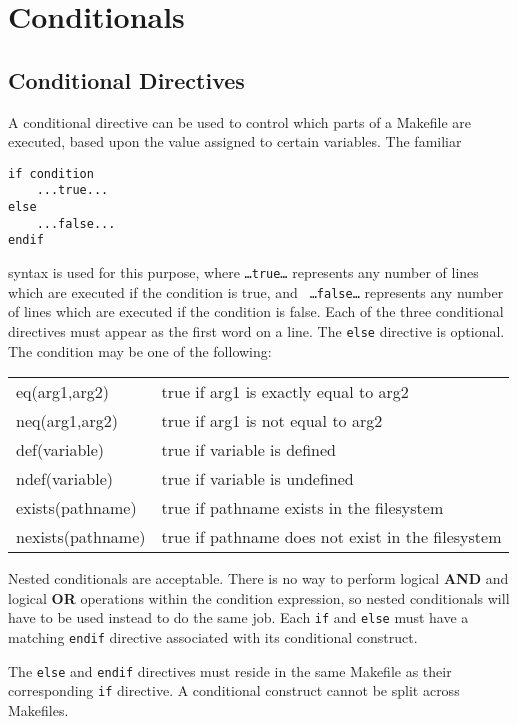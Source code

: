 \section{Conditionals}

\subsection{Conditional Directives}

A conditional directive can be used to control which parts of a Makefile
are executed, based upon the value assigned to certain variables.  The
familiar

\begin{verbatim}
if condition
    ...true...
else
    ...false...
endif
\end{verbatim}

syntax is used for this purpose, where {\tt \ldots true\ldots} represents
any number of lines which are executed if the condition is true, and {\tt
\ldots false\ldots} represents any number of lines which are executed if
the condition is false.  Each of the three conditional directives must
appear as the first word on a line.  The {\tt else} directive is optional.
The condition may be one of the following:

\begin{tabular}{ll}
eq(arg1,arg2)	& true if arg1 is exactly equal to arg2 \\
neq(arg1,arg2)	& true if arg1 is not equal to arg2 \\
def(variable)	& true if variable is defined \\
ndef(variable)	& true if variable is undefined \\
exists(pathname)	& true if pathname exists in the filesystem \\
nexists(pathname)	& true if pathname does not exist in the filesystem
\end{tabular}

Nested conditionals are acceptable.  There is no way to perform logical
{\bf AND} and logical {\bf OR} operations within the condition expression,
so nested conditionals will have to be used instead to do the same job.
Each {\tt if} and {\tt else} must have a matching {\tt endif} directive
associated with its conditional construct.

The {\tt else} and {\tt endif} directives must reside in the same Makefile
as their corresponding {\tt if} directive.  A conditional construct cannot
be split across Makefiles.

